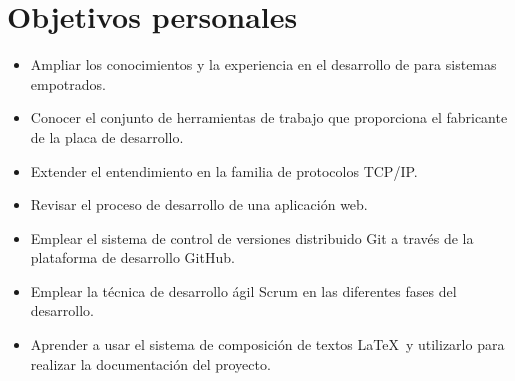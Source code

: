 \section{Objetivos personales}\label{sec:obj_personales}
\begin{itemize}
  \item Ampliar los conocimientos y la experiencia en el desarrollo de
   para sistemas empotrados.
  \item Conocer el conjunto de herramientas de trabajo que proporciona el
  fabricante de la placa de desarrollo.
  \item Extender el entendimiento en la familia de protocolos TCP/IP.
  \item Revisar el proceso de desarrollo de una aplicación web.
  \item Emplear el sistema de control de versiones distribuido Git a través
  de la plataforma de desarrollo GitHub.
  \item Emplear la técnica de desarrollo ágil Scrum en las diferentes fases del
  desarrollo.
  \item Aprender a usar el sistema de composición de textos \LaTeX\ y utilizarlo
  para realizar la documentación del proyecto.
\end{itemize}
